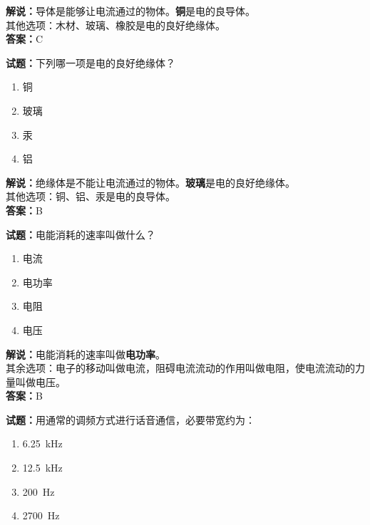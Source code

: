 \documentclass{ctexbook}
\begin{document}
\noindent\textbf{解说：}导体是能够让电流通过的物体。\textbf{铜}是电的良导体。\\
其他选项：木材、玻璃、橡胶是电的良好绝缘体。\\
\noindent\textbf{答案：}C

\vspace{\baselineskip}

\noindent\textbf{试题：}下列哪一项是电的良好绝缘体？

\begin{enumerate}[leftmargin=3em]
  \item 铜
  \item 玻璃
  \item 汞
  \item 铝
\end{enumerate}

\noindent\textbf{解说：}绝缘体是不能让电流通过的物体。\textbf{玻璃}是电的良好绝缘体。\\
其他选项：铜、铝、汞是电的良导体。\\
\noindent\textbf{答案：}B

\vspace{\baselineskip}

\noindent\textbf{试题：}电能消耗的速率叫做什么？

\begin{enumerate}[leftmargin=3em]
  \item 电流
  \item 电功率
  \item 电阻
  \item 电压
\end{enumerate}

\noindent\textbf{解说：}电能消耗的速率叫做\textbf{电功率}。\\
其余选项：电子的移动叫做电流，阻碍电流流动的作用叫做电阻，使电流流动的力量叫做电压。\\
\noindent\textbf{答案：}B

\vspace{\baselineskip}

\noindent\textbf{试题：}用通常的调频方式进行话音通信，必要带宽约为：

\begin{enumerate}[leftmargin=3em]
  \item \qty{6.25}{\kHz}
  \item \qty{12.5}{\kHz}
  \item \qty{200}{\Hz}
  \item \qty{2700}{\Hz}
\end{enumerate}
\end{document}
